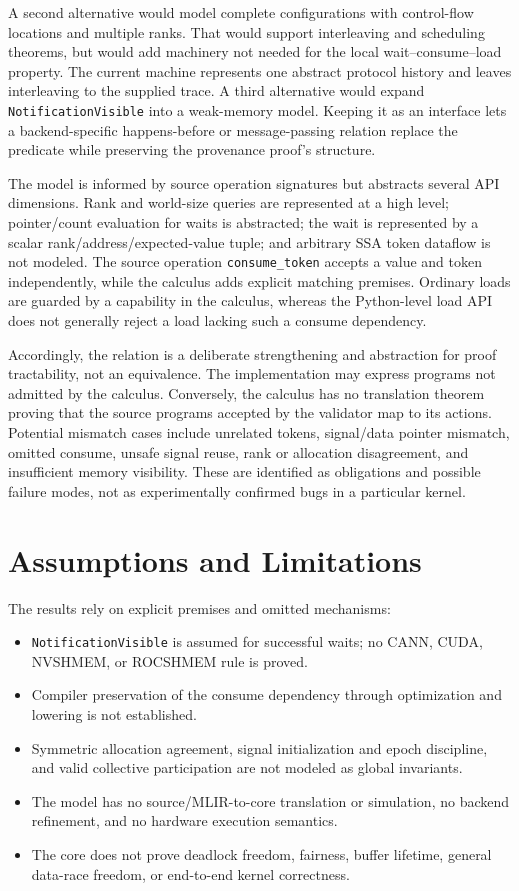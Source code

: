 \documentclass[a4paper,USenglish]{lipics-v2021}
\begin{document}
A second alternative would model complete configurations with control-flow
locations and multiple ranks. That would support interleaving and scheduling
theorems, but would add machinery not needed for the local wait--consume--load
property. The current machine represents one abstract protocol history and
leaves interleaving to the supplied trace. A third alternative would expand
\texttt{NotificationVisible} into a weak-memory model. Keeping it as an
interface lets a backend-specific happens-before or message-passing relation
replace the predicate while preserving the provenance proof's structure.

The model is informed by source operation signatures but abstracts several API dimensions. Rank and world-size queries are represented at a high level; pointer/count evaluation for waits is abstracted; the wait is represented by a scalar rank/address/expected-value tuple; and arbitrary SSA token dataflow is not modeled. The source operation \texttt{consume\_token} accepts a value and token independently, while the calculus adds explicit matching premises. Ordinary loads are guarded by a capability in the calculus, whereas the Python-level load API does not generally reject a load lacking such a consume dependency.

Accordingly, the relation is a deliberate strengthening and abstraction for proof tractability, not an equivalence. The implementation may express programs not admitted by the calculus. Conversely, the calculus has no translation theorem proving that the source programs accepted by the validator map to its actions. Potential mismatch cases include unrelated tokens, signal/data pointer mismatch, omitted consume, unsafe signal reuse, rank or allocation disagreement, and insufficient memory visibility. These are identified as obligations and possible failure modes, not as experimentally confirmed bugs in a particular kernel.

\section{Assumptions and Limitations}
The results rely on explicit premises and omitted mechanisms:
\begin{itemize}
  \item \texttt{NotificationVisible} is assumed for successful waits; no CANN, CUDA, NVSHMEM, or ROCSHMEM rule is proved.
  \item Compiler preservation of the consume dependency through optimization and lowering is not established.
  \item Symmetric allocation agreement, signal initialization and epoch discipline, and valid collective participation are not modeled as global invariants.
  \item The model has no source/MLIR-to-core translation or simulation, no backend refinement, and no hardware execution semantics.
  \item The core does not prove deadlock freedom, fairness, buffer lifetime, general data-race freedom, or end-to-end kernel correctness.
\end{itemize}
\end{document}
